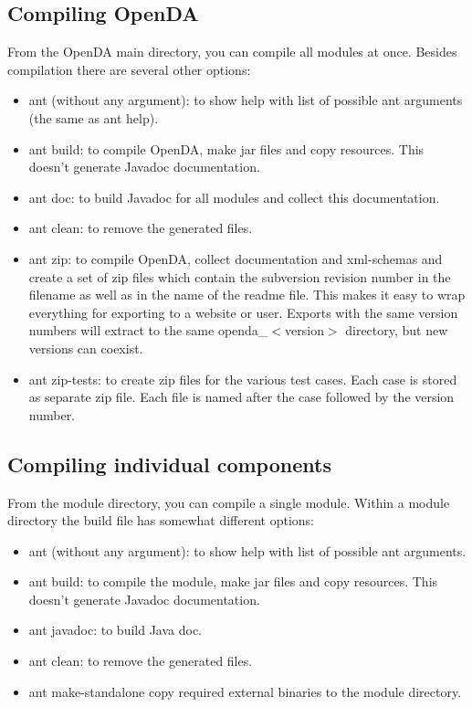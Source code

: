 \subsection{Compiling OpenDA}
From the OpenDA main directory, you can compile all modules at once. Besides compilation there are several other options:
\begin{itemize}
\item ant (without any argument): to show help with list of possible ant arguments (the same as ant help).
\item ant build: to compile OpenDA, make jar files and copy resources. This doesn't generate Javadoc documentation.
\item ant doc: to build Javadoc for all modules and collect this documentation.
\item ant clean: to remove the generated files.
\item ant zip: to compile OpenDA, collect documentation and xml-schemas and create a set of zip files which contain the subversion revision number in the filename as well as in the name of the readme file. This makes it easy to wrap everything for exporting to a website or user. Exports with the same version numbers will extract to the same openda\_$<$version$>$ directory, but new versions can coexist.
\item ant zip-tests: to create zip files for the various test cases. Each case is stored as separate zip file. Each file is named after the case followed by the version number.
\end{itemize}

\subsection{Compiling individual components}
From the module directory, you can compile a single module. Within a module directory the build file has somewhat different options:

\begin{itemize}
\item ant (without any argument): to show help with list of possible ant arguments.
\item ant build: to compile the module, make jar files and copy resources. This doesn't generate Javadoc documentation.
\item ant javadoc: to build Java doc.
\item ant clean: to remove the generated files.
\item ant make-standalone copy required external binaries to the module directory.
\end{itemize}

